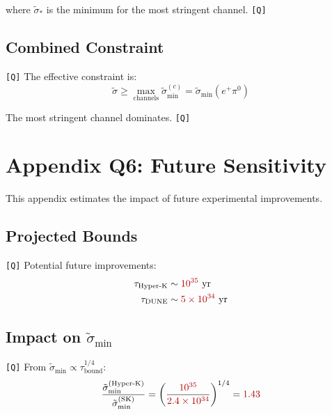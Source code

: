 \documentclass[11pt,a4paper]{article}
\newcommand{\Qval}[1]{\textcolor{red!70!black}{#1}}
\newcommand{\tagQ}{\textcolor{red!70!black}{\texttt{[Q]}}}
\theoremstyle{definition}
\begin{document}
where $\tilde{\sigma}_{*}$ is the minimum for the most stringent channel. \tagQ{}

\subsection{Combined Constraint}
\label{app:combined}

\tagQ{} The effective constraint is:
\begin{equation}
\label{eq:combined-constr}
\tilde{\sigma} \geq \max_{\text{channels}} \tilde{\sigma}_{\min}^{(c)} = \tilde{\sigma}_{\min}(e^+\pi^0)
\end{equation}

The most stringent channel dominates. \tagQ{}

\section{Appendix Q6: Future Sensitivity}
\label{app:q6}

\begin{quarantinebox}
This appendix estimates the impact of future experimental improvements.
\end{quarantinebox}

\subsection{Projected Bounds}
\label{app:projected}

\tagQ{} Potential future improvements:
\begin{align}
\label{eq:proj-hk}
\tau_{\text{Hyper-K}} &\sim \Qval{10^{35}} \text{ yr} \\
\label{eq:proj-dune}
\tau_{\text{DUNE}} &\sim \Qval{5 \times 10^{34}} \text{ yr}
\end{align}

\subsection{Impact on $\tilde{\sigma}_{\min}$}
\label{app:impact}

\tagQ{} From $\tilde{\sigma}_{\min} \propto \tau_{\text{bound}}^{1/4}$:
\begin{equation}
\label{eq:impact-hk}
\frac{\tilde{\sigma}_{\min}^{\text{(Hyper-K)}}}{\tilde{\sigma}_{\min}^{\text{(SK)}}} = \left(\frac{\Qval{10^{35}}}{\Qval{2.4 \times 10^{34}}}\right)^{1/4} = \Qval{1.43}
\end{equation}
\end{document}
